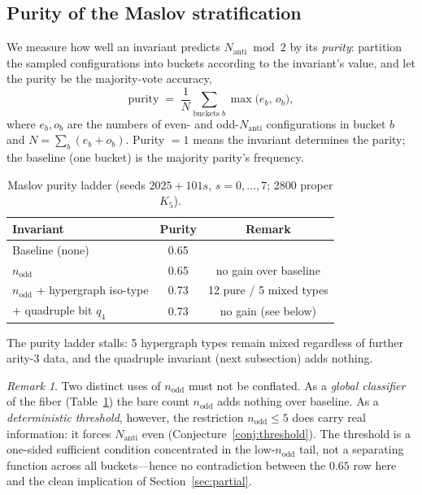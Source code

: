 \documentclass[11pt,a4paper]{article}
\theoremstyle{remark}
\newtheorem{remark}[theorem]{Remark}
\newcommand{\Nanti}{N_{\mathrm{anti}}}
\begin{document}
\subsection{Purity of the Maslov stratification}

We measure how well an invariant predicts $\Nanti\bmod2$ by its
\emph{purity}: partition the sampled configurations into buckets according to the
invariant's value, and let the purity be the majority-vote accuracy,
\[
  \mathrm{purity}
  \;=\;\frac{1}{N}\sum_{\text{buckets }b}\max\bigl(e_b,\,o_b\bigr),
\]
where $e_b,o_b$ are the numbers of even- and odd-$\Nanti$ configurations in bucket $b$
and $N=\sum_b(e_b+o_b)$. Purity $=1$ means the invariant determines the parity;
the baseline (one bucket) is the majority parity's frequency.

\begin{table}[H]
\centering
\caption{Maslov purity ladder (seeds $2025+101s$, $s=0,\ldots,7$; 2800 proper $K_5$).}
\label{tab:purity}
\begin{tabular}{lcc}
\toprule
Invariant & Purity & Remark \\
\midrule
Baseline (none) & 0.65 & \\
$n_{\mathrm{odd}}$ & 0.65 & no gain over baseline\\
$n_{\mathrm{odd}}$ + hypergraph iso-type & 0.73 & 12 pure / 5 mixed types \\
+ quadruple bit $q_4$ & 0.73 & no gain (see below) \\
\bottomrule
\end{tabular}
\end{table}

The purity ladder stalls: 5 hypergraph types remain mixed regardless of further arity-3
data, and the quadruple invariant (next subsection) adds nothing.

\begin{remark}
Two distinct uses of $n_{\mathrm{odd}}$ must not be conflated. As a \emph{global
classifier} of the fiber (Table~\ref{tab:purity}) the bare count $n_{\mathrm{odd}}$
adds nothing over baseline. As a \emph{deterministic threshold}, however, the
restriction $n_{\mathrm{odd}}\le5$ does carry real information: it forces $\Nanti$
even (Conjecture~\ref{conj:threshold}). The threshold is a one-sided sufficient
condition concentrated in the low-$n_{\mathrm{odd}}$ tail, not a separating function
across all buckets---hence no contradiction between the $0.65$ row here and the clean
implication of Section~\ref{sec:partial}.
\end{remark}
\end{document}

